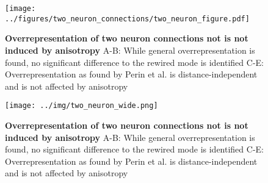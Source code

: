 

\begin{figure}[h]
\texttt{[image: ../figures/two\_neuron\_connections/two\_neuron\_figure.pdf]} %
\caption{{\bf Overrepresentation of two neuron connections not is not
    induced by anisotropy}
A-B: While general overrepresentation is found, no significant
difference to the rewired mode is identified C-E: Overrepresentation
as found by Perin et al. is distance-independent and is not affected
by anisotropy}
\label{fig_two_neuron}%
\end{figure}


\begin{figure}[h]
\texttt{[image: ../img/two\_neuron\_wide.png]} %
\caption{{\bf Overrepresentation of two neuron connections not is not
    induced by anisotropy}
A-B: While general overrepresentation is found, no significant
difference to the rewired mode is identified C-E: Overrepresentation
as found by Perin et al. is distance-independent and is not affected
by anisotropy}
\label{fig_two_neuron}%
\end{figure}

